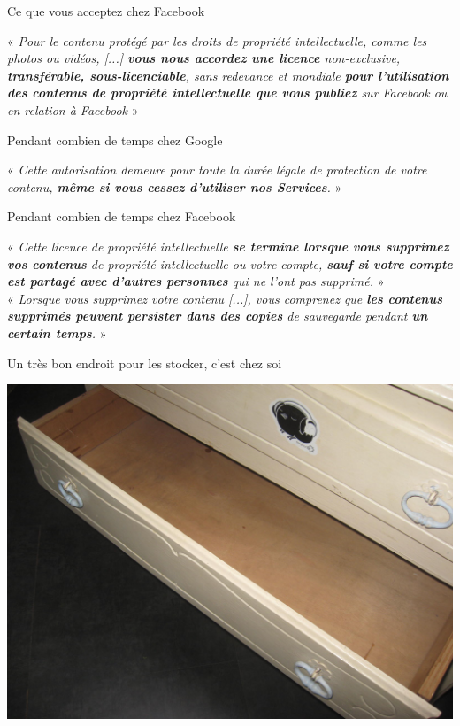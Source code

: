 \documentclass[notes=hide]{beamer}
\begin{document}
\begin{frame}[t]{Ce que vous acceptez chez Facebook}
	\vspace{4mm}
	\begin{justify}
	« \emph{Pour le contenu protégé par les droits de propriété intellectuelle, comme les photos ou vidéos, [...] \textbf{vous nous accordez une licence} non-exclusive, \textbf{transférable, sous-licenciable}, sans redevance et mondiale \textbf{pour l'utilisation des contenus de propriété intellectuelle que vous publiez} sur Facebook ou en relation à Facebook} »
	\end{justify}
\end{frame}

\begin{frame}[t]{Pendant combien de temps chez Google}
	\vfill
	\begin{justify}
	« \emph{Cette autorisation demeure pour toute la durée légale de protection de votre contenu, \textbf{même si vous cessez d’utiliser nos Services}.} »
	\end{justify}
	\vfill
\end{frame}

\begin{frame}[t]{Pendant combien de temps chez Facebook}
	\vspace{4mm}
	\begin{justify}
	« \emph{Cette licence de propriété intellectuelle \textbf{se termine lorsque vous supprimez vos contenus} de propriété intellectuelle ou votre compte, \textbf{sauf si votre compte est partagé avec d'autres personnes} qui ne l'ont pas supprimé.} »\\

	\vspace{4mm}
	« \emph{Lorsque vous supprimez votre contenu [...], vous comprenez que \textbf{les contenus supprimés peuvent persister dans des copies} de sauvegarde pendant \textbf{un certain temps}.} »
	\end{justify}
\end{frame}


\begin{frame}[t]{Un très bon endroit pour les stocker, c'est chez soi}
\begin{center}
\vfill
\includegraphics[width=.75\textwidth]{img/15b-photo-commode.jpg}
\vfill
\end{center}
\end{frame}
\end{document}
